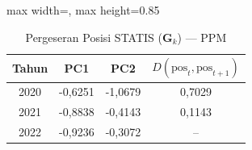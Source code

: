 \begin{table}[H]
\centering
\caption{Pergeseran Posisi STATIS ($\mathbf{G}_k$) --- PPM} \label{tab:sample2jarak_statis_loading_ppm}
\begin{adjustbox}{max width=\textwidth, max height=0.85\textheight}
\begin{tabular}{|c|c|c|c|}
\hline
\textbf{Tahun} & \textbf{PC1} & \textbf{PC2} & \textbf{$D(\text{pos}_t, \text{pos}_{t+1})$} \\
\hline
2020 & -0,6251 & -1,0679 & 0,7029 \\
2021 & -0,8838 & -0,4143 & 0,1143 \\
2022 & -0,9236 & -0,3072 & -- \\
\hline
\end{tabular}
\end{adjustbox}
\end{table}